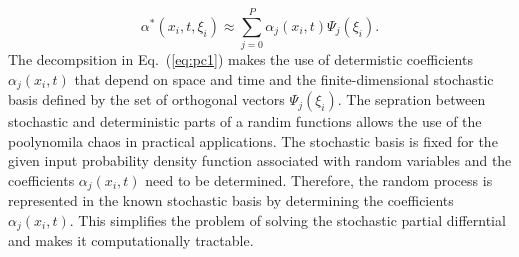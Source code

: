 \documentclass[]{aiaa-tc}%
\begin{document}
\begin{equation}\label{eq:pc1}
\alpha^*(x_i,t,\xi_i) \approx \sum_{j=0}^P \alpha_j(x_i,t) \Psi_j(\xi_i).
\end{equation}
The decompsition in Eq.~(\ref{eq:pc1}) makes the use of determistic coefficients $\alpha_j(x_i,t)$ that depend on space and time and the finite-dimensional stochastic basis defined by the set of orthogonal vectors $\Psi_j(\xi_i)$. The sepration between stochastic and deterministic parts of a randim functions allows the use of the poolynomila chaos in practical applications. The stochastic basis is fixed for the given input probability density function associated with random variables and the coefficients $\alpha_j(x_i,t)$ need to be determined. Therefore, the random process is represented in the known stochastic basis by determining the coefficients $\alpha_j(x_i,t)$. This simplifies the problem of solving the stochastic partial differntial and makes it computationally tractable.
\end{document}
